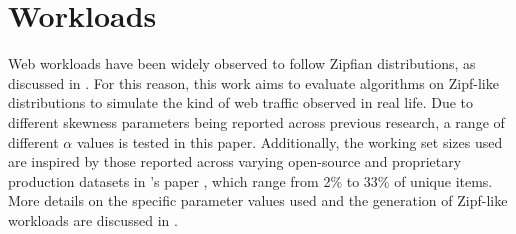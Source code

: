 \section{Workloads}\label{sec: workloads}

Web workloads have been widely observed to follow Zipfian distributions, as discussed in . For this reason, this work aims to evaluate algorithms on Zipf-like distributions to simulate the kind of web traffic observed in real life. Due to different skewness parameters being reported across previous research, a range of different $\alpha$ values is tested in this paper. Additionally, the working set sizes used are inspired by those reported across varying open-source and proprietary production datasets in \citeauthor{sieve}'s paper \cite{sieve}, which range from 2\% to 33\% of unique items. More details on the specific parameter values used and the generation of Zipf-like workloads are discussed in .


